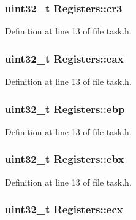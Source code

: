 \subsubsection[{\texorpdfstring{cr3}{cr3}}]{\setlength{\rightskip}{0pt plus 5cm}uint32\+\_\+t Registers\+::cr3}\hypertarget{structRegisters_ab818d6f237e6d73d321339e6fcd66abf}{}\label{structRegisters_ab818d6f237e6d73d321339e6fcd66abf}


Definition at line 13 of file task.\+h.

\subsubsection[{\texorpdfstring{eax}{eax}}]{\setlength{\rightskip}{0pt plus 5cm}uint32\+\_\+t Registers\+::eax}\hypertarget{structRegisters_aafc7189a84cb0f6ed3d37ee82bec09bc}{}\label{structRegisters_aafc7189a84cb0f6ed3d37ee82bec09bc}


Definition at line 13 of file task.\+h.

\subsubsection[{\texorpdfstring{ebp}{ebp}}]{\setlength{\rightskip}{0pt plus 5cm}uint32\+\_\+t Registers\+::ebp}\hypertarget{structRegisters_a1e7101b224fc3550bd4b64bb39d83036}{}\label{structRegisters_a1e7101b224fc3550bd4b64bb39d83036}


Definition at line 13 of file task.\+h.

\subsubsection[{\texorpdfstring{ebx}{ebx}}]{\setlength{\rightskip}{0pt plus 5cm}uint32\+\_\+t Registers\+::ebx}\hypertarget{structRegisters_a3aa9baab41ed6c513cbecb126dc90373}{}\label{structRegisters_a3aa9baab41ed6c513cbecb126dc90373}


Definition at line 13 of file task.\+h.

\subsubsection[{\texorpdfstring{ecx}{ecx}}]{\setlength{\rightskip}{0pt plus 5cm}uint32\+\_\+t Registers\+::ecx}\hypertarget{structRegisters_a9a7eb0450238154baa25c72993a0e5e0}{}\label{structRegisters_a9a7eb0450238154baa25c72993a0e5e0}


